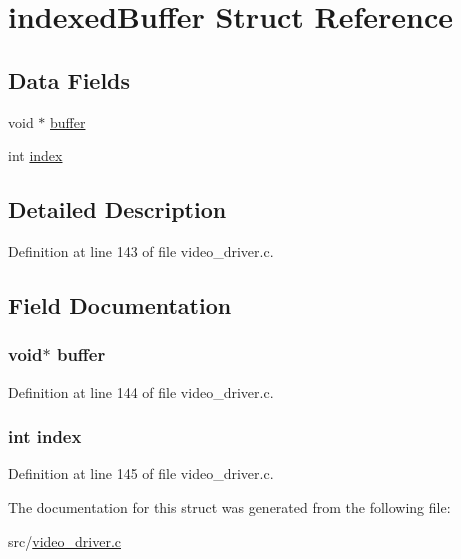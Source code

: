 \hypertarget{structindexed_buffer}{
\section{indexedBuffer Struct Reference}
\label{structindexed_buffer}
}
\subsection*{Data Fields}
\begin{DoxyCompactItemize}
\item 
void $\ast$ \hyperlink{structindexed_buffer_a368f7094dc38acca20612bbb392552f4}{buffer}
\item 
int \hyperlink{structindexed_buffer_a750b5d744c39a06bfb13e6eb010e35d0}{index}
\end{DoxyCompactItemize}


\subsection{Detailed Description}


Definition at line 143 of file video\_\-driver.c.



\subsection{Field Documentation}
\hypertarget{structindexed_buffer_a368f7094dc38acca20612bbb392552f4}{
\subsubsection[{buffer}]{\setlength{\rightskip}{0pt plus 5cm}void$\ast$ {\bf buffer}}}
\label{structindexed_buffer_a368f7094dc38acca20612bbb392552f4}


Definition at line 144 of file video\_\-driver.c.

\hypertarget{structindexed_buffer_a750b5d744c39a06bfb13e6eb010e35d0}{
\subsubsection[{index}]{\setlength{\rightskip}{0pt plus 5cm}int {\bf index}}}
\label{structindexed_buffer_a750b5d744c39a06bfb13e6eb010e35d0}


Definition at line 145 of file video\_\-driver.c.



The documentation for this struct was generated from the following file:\begin{DoxyCompactItemize}
\item 
src/\hyperlink{video__driver_8c}{video\_\-driver.c}\end{DoxyCompactItemize}
